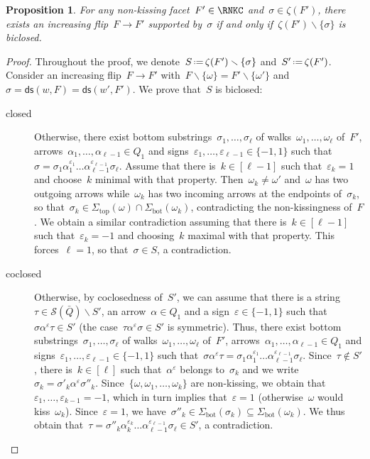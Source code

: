 \documentclass{amsart}
\newtheorem{proposition}[theorem]{Proposition}
\theoremstyle{definition}
\newcommand{\ssm}{\smallsetminus} %
\newcommand{\eqdef}{\mbox{\,\raisebox{0.2ex}{\scriptsize\ensuremath{\mathrm:}}\ensuremath{=}\,}} %
\newcommand{\strings}{\mathcal{S}} %
\newcommand{\distinguishedString}[2]{\mathsf{ds}(#1,#2)} %
\renewcommand{\top}{\mathrm{top}} %
\newcommand{\bottom}{\mathrm{bot}} %
\begin{document}
\begin{proposition}
\label{prop:covers}
For any non-kissing facet~$F' \in \RNKC$ and~$\sigma \in \zeta(F')$, there exists an increasing flip~$F \to F'$ supported by~$\sigma$ if and only if~$\zeta(F') \ssm \{\sigma\}$ is biclosed.
\end{proposition}

\begin{proof}
Throughout the proof, we denote~$S \eqdef \zeta(F') \ssm \{\sigma\}$ and~$S' \eqdef \zeta(F')$.
Consider an increasing flip~$F \to F'$ with~$F \ssm \{\omega\} = F' \ssm \{\omega'\}$ and~$\sigma = \distinguishedString{w}{F} = \distinguishedString{w'}{F'}$.
We prove that~$S$ is biclosed:
\begin{description}
\item[closed] Otherwise, there exist bottom substrings~$\sigma_1, \dots, \sigma_\ell$ of walks~$\omega_1, \dots, \omega_\ell$ of~$F'$, arrows~$\alpha_1, \dots, \alpha_{\ell-1} \in Q_1$ and signs~$\varepsilon_1, \dots, \varepsilon_{\ell-1} \in \{-1,1\}$ such that~$\sigma = \sigma_1 \alpha_1^{\varepsilon_1} \dots \alpha_{\ell-1}^{\varepsilon_{\ell-1}} \sigma_\ell$.
Assume that there is~$k \in [\ell-1]$ such that~$\varepsilon_k = 1$ and choose~$k$ minimal with that property.
Then~$\omega_k \ne \omega'$ and~$\omega$ has two outgoing arrows while~$\omega_k$ has two incoming arrows at the endpoints of~$\sigma_k$, so that~$\sigma_k \in \Sigma_\top(\omega) \cap \Sigma_\bottom(\omega_k)$, contradicting the non-kissingness of~$F$.
We obtain a similar contradiction assuming that there is~$k \in [\ell-1]$ such that~$\varepsilon_k = -1$ and choosing~$k$ maximal with that property.
This forces~$\ell = 1$, so that~$\sigma \in S$, a contradiction.

\item[coclosed] Otherwise, by coclosedness of~$S'$, we can assume that there is a string~${\tau \in \strings(\bar Q) \ssm S'}$, an arrow~$\alpha \in Q_1$ and a sign~$\varepsilon \in \{-1,1\}$ such that~$\sigma \alpha^\varepsilon \tau \in S'$ (the case~${\tau \alpha^\varepsilon \sigma \in S'}$ is symmetric).
Thus, there exist bottom substrings~$\sigma_1, \dots, \sigma_\ell$ of walks~$\omega_1, \dots, \omega_\ell$ of~$F'$, arrows~$\alpha_1, \dots, \alpha_{\ell-1} \in Q_1$ and signs~$\varepsilon_1, \dots, \varepsilon_{\ell-1} \in \{-1,1\}$ such that~$\sigma \alpha^\varepsilon \tau = \sigma_1 \alpha_1^{\varepsilon_1} \dots \alpha_{\ell-1}^{\varepsilon_{\ell-1}} \sigma_\ell$.
Since~$\tau \notin S'$, there is~$k \in [\ell]$ such that~$\alpha^\varepsilon$ belongs to~$\sigma_k$ and we write~$\sigma_k = \sigma'_k \alpha^\varepsilon \sigma''_k$.
Since~$\{\omega, \omega_1, \dots, \omega_k\}$ are non-kissing, we obtain that~$\varepsilon_1, \dots, \varepsilon_{k-1} = -1$, which in turn implies that~$\varepsilon = 1$ (otherwise~$\omega$ would kiss~$\omega_k$).
Since~$\varepsilon = 1$, we have~${\sigma''_k \in \Sigma_\bottom(\sigma_k) \subseteq \Sigma_\bottom(\omega_k)}$.
We thus obtain that~$\tau = \sigma''_k \alpha_k^{\varepsilon_k} \dots \alpha_{\ell-1}^{\varepsilon_{\ell-1}} \sigma_\ell \in S'$, a contradiction.
\end{description}


\end{proof}
\end{document}
